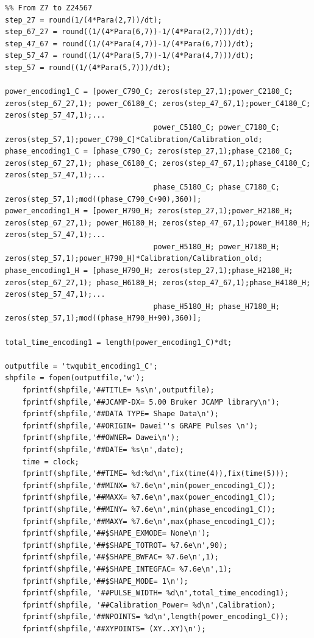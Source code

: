 \documentclass[prl,onecolumn]{revtex4-1}
\begin{document}
\begin{lstlisting}
%% From Z7 to Z24567
step_27 = round(1/(4*Para(2,7))/dt);
step_67_27 = round((1/(4*Para(6,7))-1/(4*Para(2,7)))/dt);
step_47_67 = round((1/(4*Para(4,7))-1/(4*Para(6,7)))/dt);
step_57_47 = round((1/(4*Para(5,7))-1/(4*Para(4,7)))/dt);
step_57 = round((1/(4*Para(5,7)))/dt);

power_encoding1_C = [power_C790_C; zeros(step_27,1);power_C2180_C; zeros(step_67_27,1); power_C6180_C; zeros(step_47_67,1);power_C4180_C; zeros(step_57_47,1);...
                                  power_C5180_C; power_C7180_C; zeros(step_57,1);power_C790_C]*Calibration/Calibration_old;
phase_encoding1_C = [phase_C790_C; zeros(step_27,1);phase_C2180_C; zeros(step_67_27,1); phase_C6180_C; zeros(step_47_67,1);phase_C4180_C; zeros(step_57_47,1);...
                                  phase_C5180_C; phase_C7180_C; zeros(step_57,1);mod((phase_C790_C+90),360)];
power_encoding1_H = [power_H790_H; zeros(step_27,1);power_H2180_H; zeros(step_67_27,1); power_H6180_H; zeros(step_47_67,1);power_H4180_H; zeros(step_57_47,1);...
                                  power_H5180_H; power_H7180_H; zeros(step_57,1);power_H790_H]*Calibration/Calibration_old;
phase_encoding1_H = [phase_H790_H; zeros(step_27,1);phase_H2180_H; zeros(step_67_27,1); phase_H6180_H; zeros(step_47_67,1);phase_H4180_H; zeros(step_57_47,1);...
                                  phase_H5180_H; phase_H7180_H; zeros(step_57,1);mod((phase_H790_H+90),360)];

total_time_encoding1 = length(power_encoding1_C)*dt;

outputfile = 'twqubit_encoding1_C';
shpfile = fopen(outputfile,'w');
    fprintf(shpfile,'##TITLE= %s\n',outputfile);
    fprintf(shpfile,'##JCAMP-DX= 5.00 Bruker JCAMP library\n');
    fprintf(shpfile,'##DATA TYPE= Shape Data\n');
    fprintf(shpfile,'##ORIGIN= Dawei''s GRAPE Pulses \n');
    fprintf(shpfile,'##OWNER= Dawei\n');
    fprintf(shpfile,'##DATE= %s\n',date);
    time = clock;
    fprintf(shpfile,'##TIME= %d:%d\n',fix(time(4)),fix(time(5)));
    fprintf(shpfile,'##MINX= %7.6e\n',min(power_encoding1_C));
    fprintf(shpfile,'##MAXX= %7.6e\n',max(power_encoding1_C));
    fprintf(shpfile,'##MINY= %7.6e\n',min(phase_encoding1_C));
    fprintf(shpfile,'##MAXY= %7.6e\n',max(phase_encoding1_C));
    fprintf(shpfile,'##$SHAPE_EXMODE= None\n');
    fprintf(shpfile,'##$SHAPE_TOTROT= %7.6e\n',90);
    fprintf(shpfile,'##$SHAPE_BWFAC= %7.6e\n',1);
    fprintf(shpfile,'##$SHAPE_INTEGFAC= %7.6e\n',1);
    fprintf(shpfile,'##$SHAPE_MODE= 1\n');
    fprintf(shpfile, '##PULSE_WIDTH= %d\n',total_time_encoding1);
    fprintf(shpfile, '##Calibration_Power= %d\n',Calibration);
    fprintf(shpfile,'##NPOINTS= %d\n',length(power_encoding1_C));
    fprintf(shpfile,'##XYPOINTS= (XY..XY)\n');


\end{lstlisting}
\end{document}
